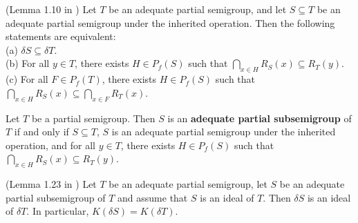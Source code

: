 \documentclass[twoside,11pt]{article}
\begin{document}
\begin{lemma} \label{1.10} (Lemma 1.10 in \cite{McLeod1})
	Let \(T\) be an adequate partial semigroup, and let \(S \subseteq T\) be an adequate partial semigroup under the inherited operation. Then the following statements are equivalent: \\
	(a) \(\delta S \subseteq \delta T\). \\
	(b) For all \(y \in T\), there exists \(H \in P_f(S)\) such that \(\bigcap_{x \in H} R_S(x) \subseteq R_T(y)\). \\
	(c) For all \(F \in P_f(T)\), there exists \(H \in P_f(S)\) such that \(\bigcap_{x \in H} R_S(x) \subseteq \bigcap_{x \in F} R_T(x)\).
\end{lemma}

\begin{definition} \label{1.11}
	Let \( T \) be a partial semigroup. Then \( S \) is an \textbf{adequate partial subsemigroup} of \( T \) if and only if \( S \subseteq T \),  
	\( S \) is an adequate partial semigroup under the inherited operation, and for all \( y \in T \), there exists \( H \in P_f(S) \) such that  
	$\bigcap_{x \in H} R_S(x) \subseteq R_T(y)$.	  
\end{definition}

\begin{theorem} \label{1.23}(Lemma 1.23 in \cite{McLeod1})
	Let $T$ be an adequate partial semigroup, let $S$ be an adequate partial subsemigroup of $T$ and assume that $S$ is an ideal of $T$. Then $\delta S$ is an ideal of $\delta T$. In particular, $K(\delta S) = K(\delta T)$.
\end{theorem}
\end{document}
